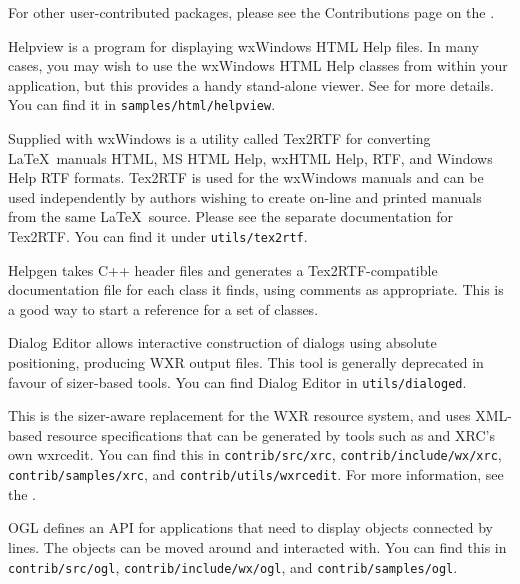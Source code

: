 For other user-contributed packages, please see the Contributions page
on the .

\begin{description}\itemsep=0pt
\item[{\bf Helpview}]
Helpview is a program for displaying wxWindows HTML
Help files. In many cases, you may wish to use the wxWindows HTML
Help classes from within your application, but this provides a
handy stand-alone viewer. See  for more details.
You can find it in {\tt samples/html/helpview}.

\item[{\bf Tex2RTF}]
Supplied with wxWindows is a utility called Tex2RTF for converting\rtfsp
\LaTeX\ manuals HTML, MS HTML Help, wxHTML Help, RTF, and Windows
Help RTF formats. Tex2RTF is used for the wxWindows manuals and can be used independently
by authors wishing to create on-line and printed manuals from the same\rtfsp
\LaTeX\ source. Please see the separate documentation for Tex2RTF.
You can find it under {\tt utils/tex2rtf}.

\item[{\bf Helpgen}]
Helpgen takes C++ header files and generates a Tex2RTF-compatible
documentation file for each class it finds, using comments as appropriate.
This is a good way to start a reference for a set of classes.

\item[{\bf Dialog Editor}]
Dialog Editor allows interactive construction of dialogs using
absolute positioning, producing WXR output files. This tool is generally deprecated
in favour of sizer-based tools. You can find Dialog Editor
in {\tt utils/dialoged}.

\item[{\bf XRC resource system}]
This is the sizer-aware replacement for the WXR resource system, and uses
XML-based resource specifications that can be generated by tools
such as  and XRC's own wxrcedit.
You can find this in {\tt contrib/src/xrc}, {\tt contrib/include/wx/xrc}, {\tt contrib/samples/xrc}, and {\tt contrib/utils/wxrcedit}.
For more information, see the .

\item[{\bf Object Graphics Library}]
OGL defines an API for applications that need to display objects connected by lines.
The objects can be moved around and interacted with.
You can find this in {\tt contrib/src/ogl}, {\tt contrib/include/wx/ogl}, and {\tt contrib/samples/ogl}.


\end{description}
